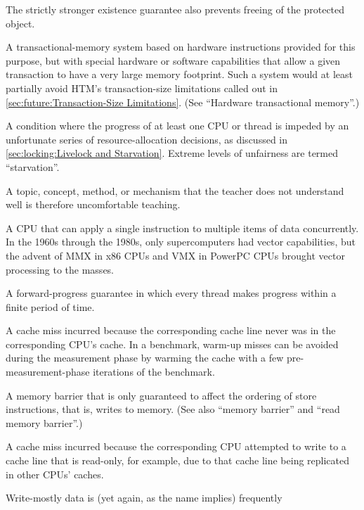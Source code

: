 \begin{description}
	The strictly stronger existence guarantee also prevents freeing
	of the protected object.
\item[Unbounded Transactional Memory (UTM):]
	A transactional-memory system based on hardware instructions
	provided for this purpose, but with special hardware or
	software capabilities that allow a given transaction to
	have a very large memory footprint.
	Such a system would at least partially avoid
	HTM's transaction-size limitations called out in
	\cref{sec:future:Transaction-Size Limitations}.
	(See ``Hardware transactional memory''.)
\item[\IXG{Unfairness}:]
	A condition where the progress of at least one CPU or thread
	is impeded by an unfortunate series of resource-allocation
	decisions, as discussed in
	\cref{sec:locking:Livelock and Starvation}.
	Extreme levels of unfairness are termed ``starvation''.
\item[\IXG{Unteachable}:]
	A topic, concept, method, or mechanism that the teacher does
	not understand well is therefore uncomfortable teaching.
\item[\IXGr{Vector CPU}:]
	A CPU that can apply a single instruction to multiple items of
	data concurrently.
	In the 1960s through the 1980s, only supercomputers had vector
	capabilities, but the advent of MMX in x86 CPUs and VMX in
	PowerPC CPUs brought vector processing to the masses.
\item[\IXG{Wait Free}:]
	A forward-progress guarantee in which every thread makes
	progress within a finite period of time.
\item[\IXGalth{Warm-up Miss}{warm-up}{cache miss}:]
	A cache miss incurred because the corresponding cache line
	never was in the corresponding CPU's cache.
	In a benchmark, warm-up misses can be avoided during
	the measurement phase by warming the cache with a few
	pre-measurement-phase iterations of the benchmark.
\item[\IXGh{Write}{Memory Barrier}:]
	A memory barrier that is only guaranteed to affect the ordering
	of store instructions, that is, writes to memory.
	(See also ``memory barrier'' and ``read memory barrier''.)
\item[\IXGalth{Write Miss}{write}{cache miss}:]
	A cache miss incurred because the corresponding CPU attempted
	to write to a cache line that is read-only, for example, due
	to that cache line being replicated in other CPUs' caches.
\item[\IXG{Write Mostly}:]
	Write-mostly data is (yet again, as the name implies) frequently

\end{description}
